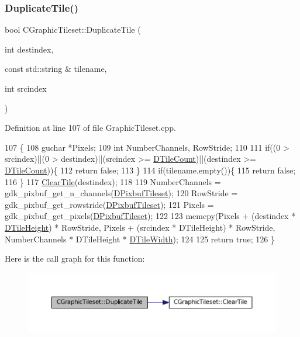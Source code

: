 \subsubsection{\texorpdfstring{Duplicate\+Tile()}{DuplicateTile()}}
{\footnotesize\ttfamily bool C\+Graphic\+Tileset\+::\+Duplicate\+Tile (\begin{DoxyParamCaption}\item[{int}]{destindex,  }\item[{const std\+::string \&}]{tilename,  }\item[{int}]{srcindex }\end{DoxyParamCaption})}



Definition at line 107 of file Graphic\+Tileset.\+cpp.


\begin{DoxyCode}
107                                                                                          \{
108     guchar *Pixels;
109     \textcolor{keywordtype}{int} NumberChannels, RowStride;
110     
111     \textcolor{keywordflow}{if}((0 > srcindex)||(0 > destindex)||(srcindex >= \hyperlink{classCGraphicTileset_a39d942b370e47f441bf97385eb1037c8}{DTileCount})||(destindex >= 
      \hyperlink{classCGraphicTileset_a39d942b370e47f441bf97385eb1037c8}{DTileCount}))\{
112         \textcolor{keywordflow}{return} \textcolor{keyword}{false};
113     \}
114     \textcolor{keywordflow}{if}(tilename.empty())\{
115         \textcolor{keywordflow}{return} \textcolor{keyword}{false};
116     \}
117     \hyperlink{classCGraphicTileset_aefeefc9e2ad01ceb8a781bd455859f76}{ClearTile}(destindex);
118     
119     NumberChannels = gdk\_pixbuf\_get\_n\_channels(\hyperlink{classCGraphicTileset_a5d5adfcdbb347a6df3f57535ca08e3ef}{DPixbufTileset});
120     RowStride = gdk\_pixbuf\_get\_rowstride(\hyperlink{classCGraphicTileset_a5d5adfcdbb347a6df3f57535ca08e3ef}{DPixbufTileset});
121     Pixels = gdk\_pixbuf\_get\_pixels(\hyperlink{classCGraphicTileset_a5d5adfcdbb347a6df3f57535ca08e3ef}{DPixbufTileset});
122     
123     memcpy(Pixels + (destindex * \hyperlink{classCGraphicTileset_af48f32e07d5fe69afd5f764318cc3244}{DTileHeight}) * RowStride, Pixels + (srcindex * DTileHeight) * 
      RowStride, NumberChannels * DTileHeight * \hyperlink{classCGraphicTileset_a2d0c7d19865b81911a3a43d5cae50e00}{DTileWidth});
124 
125     \textcolor{keywordflow}{return} \textcolor{keyword}{true};
126 \}
\end{DoxyCode}
Here is the call graph for this function\+:\nopagebreak
\begin{figure}[H]
\begin{center}
\leavevmode
\includegraphics[width=350pt]{classCGraphicTileset_a78db70086b4cd1085fd3b5d0d0dc5fdd_cgraph}
\end{center}
\end{figure}
